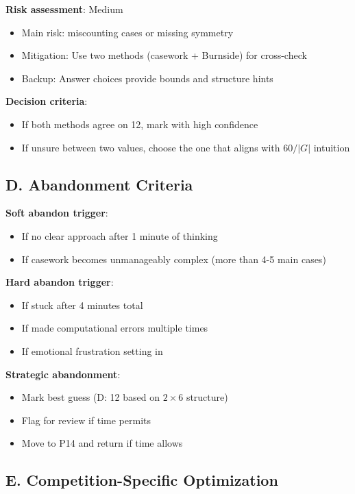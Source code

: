 \documentclass[11pt]{article}
\begin{document}
\begin{competitionbox}
\textbf{Risk assessment}: Medium
\begin{itemize}
    \item Main risk: miscounting cases or missing symmetry
    \item Mitigation: Use two methods (casework + Burnside) for cross-check
    \item Backup: Answer choices provide bounds and structure hints
\end{itemize}

\textbf{Decision criteria}:
\begin{itemize}
    \item If both methods agree on 12, mark with high confidence
    \item If unsure between two values, choose the one that aligns with $60/|G|$ intuition
\end{itemize}

\subsection*{D. Abandonment Criteria}

\textbf{Soft abandon trigger}: 
\begin{itemize}
    \item If no clear approach after 1 minute of thinking
    \item If casework becomes unmanageably complex (more than 4-5 main cases)
\end{itemize}

\textbf{Hard abandon trigger}:
\begin{itemize}
    \item If stuck after 4 minutes total
    \item If made computational errors multiple times
    \item If emotional frustration setting in
\end{itemize}

\textbf{Strategic abandonment}: 
\begin{itemize}
    \item Mark best guess (D: 12 based on $2 \times 6$ structure)
    \item Flag for review if time permits
    \item Move to P14 and return if time allows
\end{itemize}

\subsection*{E. Competition-Specific Optimization}


\end{competitionbox}
\end{document}

